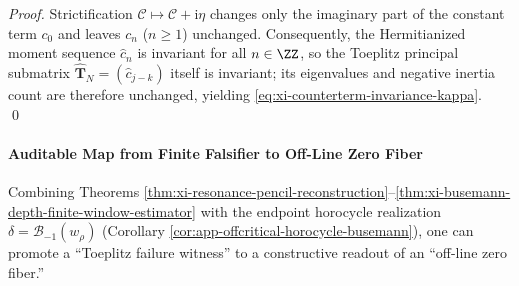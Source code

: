 \begin{proof}
Strictification \(\mathscr{C}\mapsto \mathscr{C}+\mathrm{i}\eta\) changes only the imaginary part of the constant term \(c_0\) and leaves \(c_n\) (\(n\ge 1\)) unchanged.
Consequently, the Hermitianized moment sequence \(\widehat c_n\) is invariant for all \(n\in\ZZ\), so the Toeplitz principal submatrix
\(\widehat{\mathbf{T}}_N=(\widehat c_{j-k})\) itself is invariant; its eigenvalues and negative inertia count are therefore unchanged, yielding \eqref{eq:xi-counterterm-invariance-kappa}. \qed
\end{proof}

\paragraph{Auditable Map from Finite Falsifier to Off-Line Zero Fiber}
Combining Theorems \ref{thm:xi-resonance-pencil-reconstruction}--\ref{thm:xi-busemann-depth-finite-window-estimator} with the endpoint horocycle realization
\(\delta=\mathcal{B}_{-1}(w_\rho)\) (Corollary \ref{cor:app-offcritical-horocycle-busemann}), one can promote a ``Toeplitz failure witness'' to a constructive readout of an ``off-line zero fiber.''

